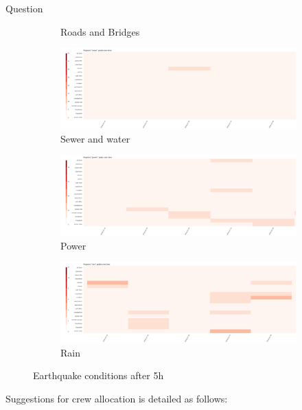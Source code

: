 \documentclass{article}
\begin{document}
\begin{section}{Question}
\begin{figure}[!h]
\begin{subfigure}[!h]{0.32\textwidth}
        \caption{Roads and Bridges}
    \end{subfigure}
    \begin{subfigure}[!h]{0.32\textwidth}
        \centering
        \includegraphics[width=1.00\textwidth]{figs/cond_5h/cond_5h_sewer.png}
        \caption{Sewer and water}
    \end{subfigure}
    \begin{subfigure}[!h]{0.32\textwidth}
        \centering
        \includegraphics[width=1.00\textwidth]{figs/cond_5h/cond_5h_power.png}
        \caption{Power}
    \end{subfigure}
    \begin{subfigure}[!h]{0.32\textwidth}
        \centering
        \includegraphics[width=1.00\textwidth]{figs/cond_5h/cond_5h_rain.png}
        \caption{Rain}
    \end{subfigure}
    \caption{Earthquake conditions after 5h}
    \label{fig:eq_cond_5h}
\end{figure}

Suggestions for crew allocation is detailed as follows: 


\end{section}
\end{document}
